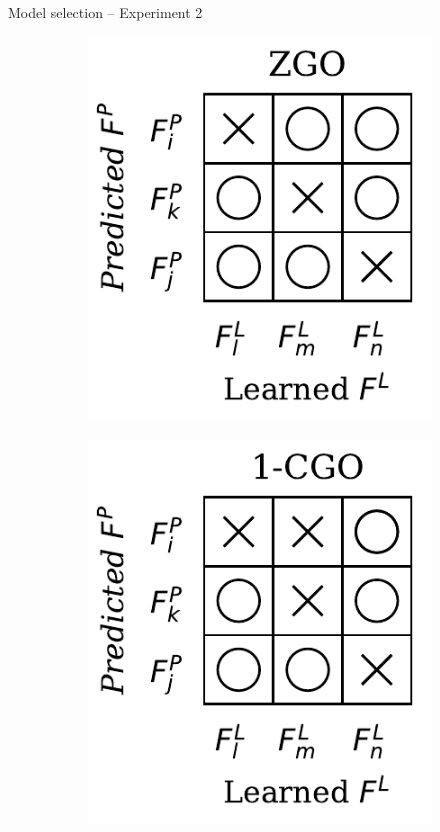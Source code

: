 \begin{frame}{Model selection -- Experiment 2}
\begin{figure}[H]
        \begin{subfigure}[b]{0.17\textwidth}
            \includegraphics[width=\textwidth]{img/msel/_ZGO.pdf}
        \end{subfigure}
        \hfill
        \begin{subfigure}[b]{0.17\textwidth}
            \includegraphics[width=\textwidth]{img/msel/_1-CGO.pdf}

\end{subfigure}
\end{figure}
\end{frame}
